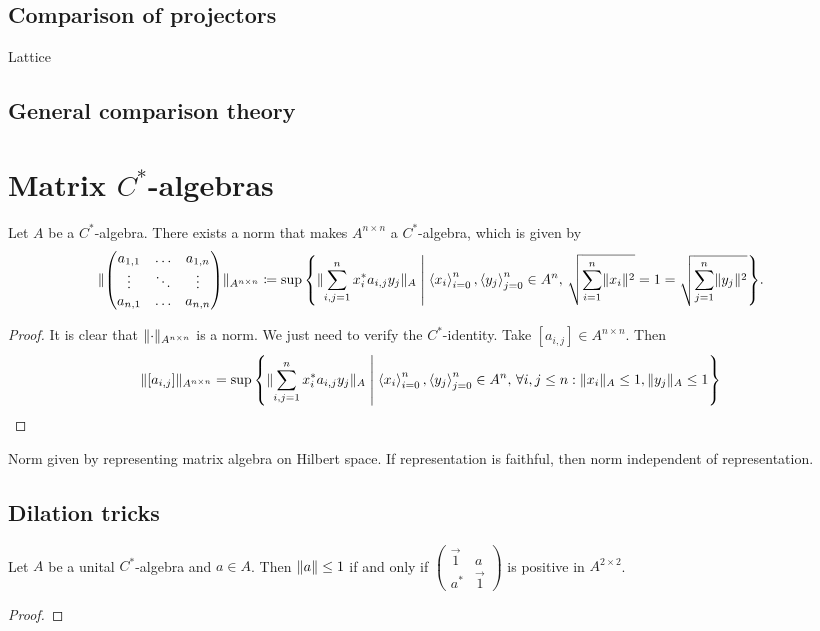 \subsection{Comparison of projectors}
Lattice
\subsection{General comparison theory}

\section{Matrix $C^*$-algebras}
\begin{proposition}
Let $A$ be a $C^*$-algebra. There exists a norm that makes $A^{n\times n}$ a $C^*$-algebra, which is given by
\begin{align*}
\norm{\begin{pmatrix}
a_{1, 1} & \hdots & a_{1,n} \\
\vdots & \ddots & \vdots \\
a_{n,1} & \hdots & a_{n,n}
\end{pmatrix}}_{A^{n\times n}} &\defeq \sup\setbuilder{\norm{\sum_{i,j=1}^nx_i^*a_{i,j}y_{j}}_A}{\seq{x_i}_{i=0}^n, \seq{y_j}_{j=0}^n\in A^n, \, \sqrt{\sum_{i=1}^n \norm{x_i}^2} = 1 = \sqrt{\sum_{j=1}^n \norm{y_j}^2}}.
\end{align*}
\end{proposition}
\begin{proof}
It is clear that $\lVert\cdot\rVert_{A^{n\times n}}$ is a norm. We just need to verify the $C^*$-identity. Take $[a_{i,j}]\in A^{n\times n}$. Then
\begin{align*}
\norm{[a_{i,j}]}_{A^{n\times n}} &= \sup\setbuilder{\norm{\sum_{i,j=1}^nx_i^*a_{i,j}y_{j}}_A}{\seq{x_i}_{i=0}^n, \seq{y_j}_{j=0}^n\in A^n, \,\forall i,j\leq n: \norm{x_i}_{A} \leq 1, \norm{y_j}_{A}\leq 1}
\end{align*}
\end{proof}

\begin{proposition}
Norm given by representing matrix algebra on Hilbert space. If representation is faithful, then norm independent of representation.
\end{proposition}

\subsection{Dilation tricks}
\begin{lemma}
Let $A$ be a unital $C^*$-algebra and $a\in A$. Then $\lVert a\rVert\leq 1$ \textup{if and only if} $\begin{pmatrix}
\vec{1} & a \\ a^* & \vec{1}
\end{pmatrix}$ is positive in $A^{2\times 2}$.
\end{lemma}
\begin{proof}

\end{proof}

